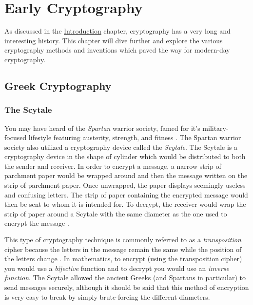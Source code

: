 \chapter{Early Cryptography} %
\label{Early Cryptography} %


As discussed in the \hyperref[Introduction]{Introduction} chapter, cryptography has a very long and interesting history. 
This chapter will dive further and explore the various cryptography methods and inventions which paved the 
way for modern-day cryptography.

\section{Greek Cryptography}

\subsection{The Scytale}

You may have heard of the \textit{Spartan} warrior society, famed for it's military-focused lifestyle featuring austerity,
strength, and fitness \cite{wiki:spartan_army}. The Spartan warrior society also utilized a cryptography device called the
\textit{Scytale}. The Scytale is a cryptography device in the shape of cylinder which would be distributed to both the sender
and receiver. In order to encrypt a message, a narrow strip of parchment paper would be wrapped around and then the message
written on the strip of parchment paper. Once unwrapped, the paper displays seemingly useless and confusing letters. The 
strip of paper containing the encrypted message would then be sent to whom it is intended for. To decrypt, the receiver would
wrap the strip of paper around a Scytale with the same diameter as the one used to encrypt the message 
\cite{history_of_cryptography}.

This type of cryptography technique is commonly referred to as a \textit{transposition} cipher because the letters
in the message remain the same while the position of the letters change \cite{wiki:scytale}. In mathematics, to encrypt
(using the transposition cipher) you would use a \textit{bijective} function and to decrypt you would use an 
\textit{inverse function}. The Scytale allowed the ancient Greeks (and Spartans in particular) to send messages 
securely, although it should be said that this method of encryption is very easy to break by simply brute-forcing the different 
diameters.

